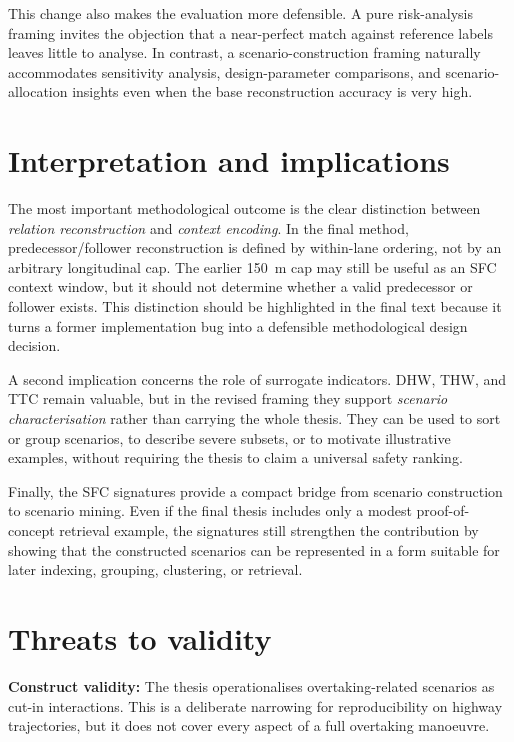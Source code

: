 \documentclass[12pt,a4paper,twoside,openright]{report}
\begin{document}
    This change also makes the evaluation more defensible. A pure risk-analysis framing invites the objection that a near-perfect match against reference labels leaves little to analyse. In contrast, a scenario-construction framing naturally accommodates sensitivity analysis, design-parameter comparisons, and scenario-allocation insights even when the base reconstruction accuracy is very high.

    \section{Interpretation and implications}
    The most important methodological outcome is the clear distinction between \emph{relation reconstruction} and \emph{context encoding}. In the final method, predecessor/follower reconstruction is defined by within-lane ordering, not by an arbitrary longitudinal cap. The earlier \SI{150}{\meter} cap may still be useful as an SFC context window, but it should not determine whether a valid predecessor or follower exists. This distinction should be highlighted in the final text because it turns a former implementation bug into a defensible methodological design decision.

    A second implication concerns the role of surrogate indicators. DHW, THW, and TTC remain valuable, but in the revised framing they support \emph{scenario characterisation} rather than carrying the whole thesis. They can be used to sort or group scenarios, to describe severe subsets, or to motivate illustrative examples, without requiring the thesis to claim a universal safety ranking.

    Finally, the SFC signatures provide a compact bridge from scenario construction to scenario mining. Even if the final thesis includes only a modest proof-of-concept retrieval example, the signatures still strengthen the contribution by showing that the constructed scenarios can be represented in a form suitable for later indexing, grouping, clustering, or retrieval.

    \section{Threats to validity}
    \textbf{Construct validity:} The thesis operationalises overtaking-related scenarios as cut-in interactions. This is a deliberate narrowing for reproducibility on highway trajectories, but it does not cover every aspect of a full overtaking manoeuvre.
\end{document}
